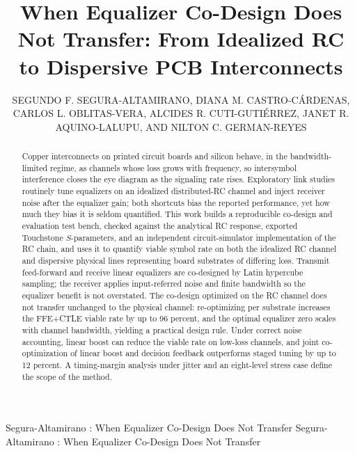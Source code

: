 \documentclass{ieeeaccess}
\begin{document}
\history{}

\title{When Equalizer Co-Design Does Not Transfer: From Idealized RC to Dispersive PCB Interconnects}

\author{\uppercase{Segundo F. Segura-Altamirano},
	\uppercase{Diana M. Castro-C\'ardenas},
	\uppercase{Carlos L. Oblitas-Vera},
	\uppercase{Alcides R. Cuti-Guti\'errez},
	\uppercase{Janet R. Aquino-Lalupu},
	AND \uppercase{Nilton C. German-Reyes}}

\address[1]{Universidad Nacional Pedro Ruiz Gallo, Lambayeque 14013, Peru (e-mail: sseguraal@unprg.edu.pe)}


\markboth
{Segura-Altamirano \headeretal: When Equalizer Co-Design Does Not Transfer}
{Segura-Altamirano \headeretal: When Equalizer Co-Design Does Not Transfer}


\begin{abstract}
Copper interconnects on printed circuit boards and silicon behave, in the
bandwidth-limited regime, as channels whose loss grows with frequency, so
intersymbol interference closes the eye diagram as the signaling rate
rises. Exploratory link studies routinely tune equalizers on an idealized
distributed-RC channel and inject receiver noise after the equalizer gain;
both shortcuts bias the reported performance, yet how much they bias it is
seldom quantified. This work builds a reproducible co-design and evaluation
test bench, checked against the analytical RC response, exported Touchstone
$S$-parameters, and an independent circuit-simulator implementation of the
RC chain, and uses it to quantify viable symbol rate on both the idealized
RC channel and dispersive physical lines representing board substrates of
differing loss. Transmit feed-forward and receive linear equalizers are
co-designed by Latin hypercube sampling; the receiver applies input-referred
noise and finite bandwidth so the equalizer benefit is not overstated. The
co-design optimized on the RC channel does not transfer unchanged to the
physical channel: re-optimizing per substrate increases the FFE+CTLE viable
rate by up to 96 percent, and the optimal equalizer zero scales with channel
bandwidth, yielding a practical design rule. Under correct noise accounting,
linear boost can reduce the viable rate on low-loss channels, and joint
co-optimization of linear boost and decision feedback outperforms staged
tuning by up to 12 percent. A timing-margin analysis under jitter and an
eight-level stress case define the scope of the method.
\end{abstract}
\end{document}
